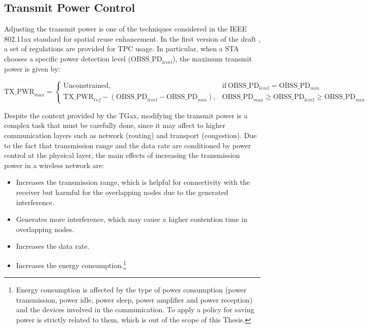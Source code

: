 \documentclass[12pt, a4paper,twoside]{tesi_upf}
\begin{document}
			\subsection{Transmit Power Control}
			\label{section:tpc}
				Adjusting the transmit power is one of the techniques considered in the IEEE 802.11ax standard for spatial reuse enhancement. In the first version of the draft \cite{tgax2016draft}, a set of regulations are provided for TPC usage. In particular, when a STA chooses a specific power detection level ($\text{OBSS\_PD}_{level}$), the maximum transmit power is given by:						
				\begin{scriptsize}
					\begin{equation}
					\text{TX\_PWR}_{max}=
					\begin{cases}
					\text{Unconstrained}, & \text{if}\ \text{OBSS\_PD}_{level} = \text{OBSS\_PD}_{min} \\
					\text{TX\_PWR}_{ref}-(\text{OBSS\_PD}_{level}-\text{OBSS\_PD}_{min}), & \text{OBSS\_PD}_{max} \geq \text{OBSS\_PD}_{level} \geq \text{OBSS\_PD}_{min}
					\end{cases}
					\nonumber
					\end{equation}				
				\end{scriptsize}				
				Despite the context provided by the TGax, modifying the transmit power is a complex task that must be carefully done, since it may affect to higher communication layers such as network (routing) and transport (congestion). Due to the fact that transmission range and the data rate are conditioned by power control at the physical layer, the main effects of increasing the transmission power in a wireless network are:
				\begin{itemize}
					\item Increases the transmission range, which is helpful for connectivity with the receiver but harmful for the overlapping nodes due to the generated interference.
					\item Generates more interference, which may cause a higher contention time in overlapping nodes.
					\item Increases the data rate.
					\item Increases the energy consumption.\footnote{Energy consumption is affected by the type of power consumption (power transmission, power idle, power sleep, power amplifier and power reception) and the devices involved in the communication. To apply a policy for saving power is strictly related to them, which is out of the scope of this Thesis.}
				\end{itemize}			
				
\end{document}
